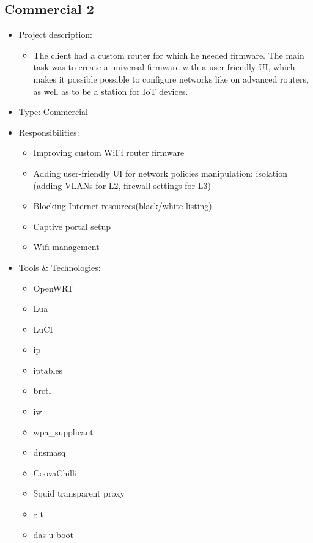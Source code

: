 \hypertarget{proj_com2}{\subsection{Commercial 2}}
\begin{itemize}
    \item Project description:
    \begin{itemize}
        \item The client had a custom router for which he needed firmware. The main task
              was to create a universal firmware with a user-friendly UI, which makes it
              possible possible to configure networks like on advanced routers, as well as to be a
              station for IoT devices.
    \end{itemize}
    \item Type: Commercial
    \item Responsibilities:
    \begin{itemize}
        \item Improving custom WiFi router firmware
        \item Adding user-friendly UI for network policies manipulation:
              isolation (adding VLANs for L2, firewall settings for L3)
        \item Blocking Internet resources(black/white listing)
        \item Captive portal setup
        \item Wifi management
    \end{itemize}
    \item Tools \& Technologies:
    \begin{itemize}
        \item OpenWRT
        \item Lua
        \item LuCI
        \item ip
        \item iptables
        \item brctl
        \item iw
        \item wpa\_supplicant
        \item dnsmasq
        \item CoovaChilli
        \item Squid transparent proxy
        \item git
        \item das u-boot
    \end{itemize}
\end{itemize}
\newpage

